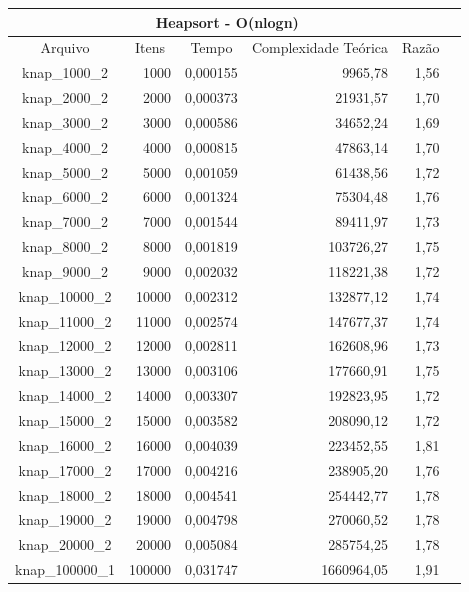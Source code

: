 \documentclass[
	12pt,				%
	oneside,			%
	a4paper,			%
	english,			%
	french,				%
	spanish,			%
	brazil,				%
	]{abntex2}
\begin{document}
\begin{longtable}{|c|r|r|r|r|r|}
\toprule
\multicolumn{5}{|c|}{\cellcolor{gray!25}\textbf{Heapsort - O(nlogn)}}\\
\midrule
\multicolumn{1}{|c|}{\cellcolor{gray!10}Arquivo} & \multicolumn{1}{|c|}{\cellcolor{gray!10}Itens} &  \multicolumn{1}{|c|}{\cellcolor{gray!10}Tempo} &
\multicolumn{1}{|c|}{\cellcolor{gray!10}Complexidade Teórica} &
\multicolumn{1}{|c|}{\cellcolor{gray!10}Razão}\\ \hline
knap\_1000\_2	&	1000	&	0,000155	&	9965,78	&	1,56	 \\ \hline
knap\_2000\_2	&	2000	&	0,000373	&	21931,57	&	1,70	 \\ \hline
knap\_3000\_2	&	3000	&	0,000586	&	34652,24	&	1,69	 \\ \hline
knap\_4000\_2	&	4000	&	0,000815	&	47863,14	&	1,70	 \\ \hline
knap\_5000\_2	&	5000	&	0,001059	&	61438,56	&	1,72	 \\ \hline
knap\_6000\_2	&	6000	&	0,001324	&	75304,48	&	1,76	 \\ \hline
knap\_7000\_2	&	7000	&	0,001544	&	89411,97	&	1,73	 \\ \hline
knap\_8000\_2	&	8000	&	0,001819	&	103726,27	&	1,75	 \\ \hline
knap\_9000\_2	&	9000	&	0,002032	&	118221,38	&	1,72	 \\ \hline
knap\_10000\_2	&	10000	&	0,002312	&	132877,12	&	1,74	 \\ \hline
knap\_11000\_2	&	11000	&	0,002574	&	147677,37	&	1,74	 \\ \hline
knap\_12000\_2	&	12000	&	0,002811	&	162608,96	&	1,73	 \\ \hline
knap\_13000\_2	&	13000	&	0,003106	&	177660,91	&	1,75	 \\ \hline
knap\_14000\_2	&	14000	&	0,003307	&	192823,95	&	1,72	 \\ \hline
knap\_15000\_2	&	15000	&	0,003582	&	208090,12	&	1,72	 \\ \hline
knap\_16000\_2	&	16000	&	0,004039	&	223452,55	&	1,81	 \\ \hline
knap\_17000\_2	&	17000	&	0,004216	&	238905,20	&	1,76	 \\ \hline
knap\_18000\_2	&	18000	&	0,004541	&	254442,77	&	1,78	 \\ \hline
knap\_19000\_2	&	19000	&	0,004798	&	270060,52	&	1,78	 \\ \hline
knap\_20000\_2	&	20000	&	0,005084	&	285754,25	&	1,78	 \\ \hline
knap\_100000\_1	&	100000	&	0,031747	&	1660964,05	&	1,91	 \\ \hline
\end{longtable}
 
\end{document}
